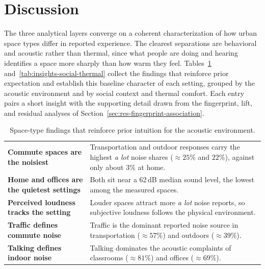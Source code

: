 \documentclass[]{interact}
\begin{document}
\section{Discussion}\label{sec:discussion}

The three analytical layers converge on a coherent characterization of how urban space types differ in reported experience.
The clearest separations are behavioral and acoustic rather than thermal, since what people are doing and hearing identifies a space more sharply than how warm they feel.
Tables~\ref{tab:insights-acoustic} and~\ref{tab:insights-social-thermal} collect the findings that reinforce prior expectation and establish this baseline character of each setting, grouped by the acoustic environment and by social context and thermal comfort.
Each entry pairs a short insight with the supporting detail drawn from the fingerprint, lift, and residual analyses of Section~\ref{sec:res-fingerprint-association}.

\begin{table}[htbp]
\centering
\caption{Space-type findings that reinforce prior intuition for the acoustic environment.}
\label{tab:insights-acoustic}
\footnotesize
\renewcommand{\arraystretch}{1.3}
\begin{tabularx}{\textwidth}{@{}>{\raggedright\arraybackslash\bfseries}p{} >{\raggedright\arraybackslash}X@{}}
\midrule
Commute spaces are the noisiest & Transportation and outdoor responses carry the highest \emph{a lot} noise shares ($\approx 25\%$ and $22\%$), against only about 3\% at home. \\
Home and offices are the quietest settings & Both sit near a 62\,dB median sound level, the lowest among the measured spaces. \\
Perceived loudness tracks the setting & Louder spaces attract more \emph{a lot} noise reports, so subjective loudness follows the physical environment. \\
Traffic defines commute noise & Traffic is the dominant reported noise source in transportation ($\approx 57\%$) and outdoors ($\approx 39\%$). \\
Talking defines indoor noise & Talking dominates the acoustic complaints of classrooms ($\approx 81\%$) and offices ($\approx 69\%$). \\
\bottomrule
\end{tabularx}
\end{table}
\end{document}
